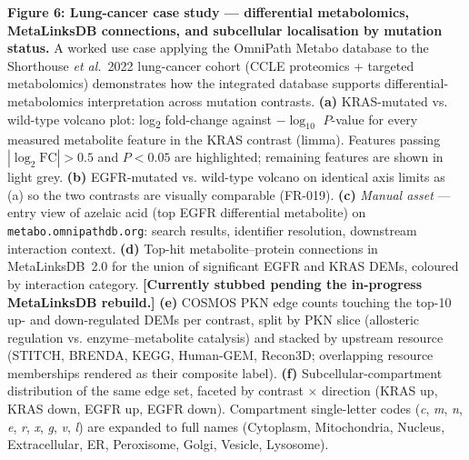 \textbf{Figure 6: Lung-cancer case study --- differential metabolomics, MetaLinksDB connections, and subcellular localisation by mutation status.}
A worked use case applying the OmniPath Metabo database to the Shorthouse \emph{et al.}\ 2022 lung-cancer cohort (CCLE proteomics + targeted metabolomics) demonstrates how the integrated database supports differential-metabolomics interpretation across mutation contrasts.
\textbf{(a)} KRAS-mutated vs. wild-type volcano plot: log\textsubscript{2} fold-change against $-\log_{10}$ $P$-value for every measured metabolite feature in the KRAS contrast (limma).
Features passing $|\log_2 \text{FC}| > 0.5$ and $P < 0.05$ are highlighted; remaining features are shown in light grey.
\textbf{(b)} EGFR-mutated vs. wild-type volcano on identical axis limits as (a) so the two contrasts are visually comparable (FR-019).
\textbf{(c)} \emph{Manual asset} --- entry view of azelaic acid (top EGFR differential metabolite) on \texttt{metabo.omnipathdb.org}: search results, identifier resolution, downstream interaction context.
\textbf{(d)} Top-hit metabolite--protein connections in MetaLinksDB~2.0 for the union of significant EGFR and KRAS DEMs, coloured by interaction category.
\textbf{[Currently stubbed pending the in-progress MetaLinksDB rebuild.]}
\textbf{(e)} COSMOS PKN edge counts touching the top-10 up- and down-regulated DEMs per contrast, split by PKN slice (allosteric regulation vs. enzyme--metabolite catalysis) and stacked by upstream resource (STITCH, BRENDA, KEGG, Human-GEM, Recon3D; overlapping resource memberships rendered as their composite label).
\textbf{(f)} Subcellular-compartment distribution of the same edge set, faceted by contrast $\times$ direction (KRAS up, KRAS down, EGFR up, EGFR down).
Compartment single-letter codes (\textit{c}, \textit{m}, \textit{n}, \textit{e}, \textit{r}, \textit{x}, \textit{g}, \textit{v}, \textit{l}) are expanded to full names (Cytoplasm, Mitochondria, Nucleus, Extracellular, ER, Peroxisome, Golgi, Vesicle, Lysosome).
